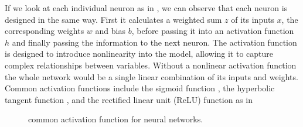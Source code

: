 If we look at each individual neuron as in , we can observe that each neuron is designed in the same way. First it calculates a weighted sum $z$ of its inputs $x$, the corresponding weights $w$ and bias $b$, before passing it into an activation function $h$ and finally passing the information to the next neuron. The activation function is designed to introduce nonlinearity into the model, allowing it to capture complex relationships between variables. Without a nonlinear activation function the whole network would be a single linear combination of its inputs and weights. Common activation functions include the sigmoid function \cite{DL_ActivationFunctions}, the hyperbolic tangent function \cite{DL_ActivationFunctions}, and the rectified linear unit (ReLU) function \cite{DL_ReLU} as in 
\begin{figure}
    \begin{center}
        \hfill
        \hfill
    \end{center}
    \caption[common activation functions in a neural network]{common activation function for neural networks.}
    \label{fig:activation_function}
\end{figure}
